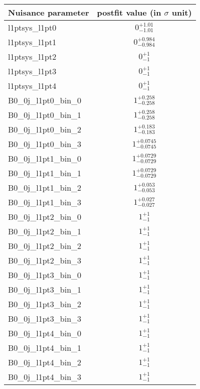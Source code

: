 
\begin{tabular}{|l|c|}
\hline
Nuisance parameter & postfit value (in $\sigma$ unit) \\\hline
l1ptsys\_l1pt0 & $0^{+1.01}_{-1.01}$ \\
l1ptsys\_l1pt1 & $0^{+0.984}_{-0.984}$ \\
l1ptsys\_l1pt2 & $0^{+1}_{-1}$ \\
l1ptsys\_l1pt3 & $0^{+1}_{-1}$ \\
l1ptsys\_l1pt4 & $0^{+1}_{-1}$ \\
B0\_0j\_l1pt0\_bin\_0 & $1^{+0.258}_{-0.258}$ \\
B0\_0j\_l1pt0\_bin\_1 & $1^{+0.258}_{-0.258}$ \\
B0\_0j\_l1pt0\_bin\_2 & $1^{+0.183}_{-0.183}$ \\
B0\_0j\_l1pt0\_bin\_3 & $1^{+0.0745}_{-0.0745}$ \\
B0\_0j\_l1pt1\_bin\_0 & $1^{+0.0729}_{-0.0729}$ \\
B0\_0j\_l1pt1\_bin\_1 & $1^{+0.0729}_{-0.0729}$ \\
B0\_0j\_l1pt1\_bin\_2 & $1^{+0.053}_{-0.053}$ \\
B0\_0j\_l1pt1\_bin\_3 & $1^{+0.027}_{-0.027}$ \\
B0\_0j\_l1pt2\_bin\_0 & $1^{+1}_{-1}$ \\
B0\_0j\_l1pt2\_bin\_1 & $1^{+1}_{-1}$ \\
B0\_0j\_l1pt2\_bin\_2 & $1^{+1}_{-1}$ \\
B0\_0j\_l1pt2\_bin\_3 & $1^{+1}_{-1}$ \\
B0\_0j\_l1pt3\_bin\_0 & $1^{+1}_{-1}$ \\
B0\_0j\_l1pt3\_bin\_1 & $1^{+1}_{-1}$ \\
B0\_0j\_l1pt3\_bin\_2 & $1^{+1}_{-1}$ \\
B0\_0j\_l1pt3\_bin\_3 & $1^{+1}_{-1}$ \\
B0\_0j\_l1pt4\_bin\_0 & $1^{+1}_{-1}$ \\
B0\_0j\_l1pt4\_bin\_1 & $1^{+1}_{-1}$ \\
B0\_0j\_l1pt4\_bin\_2 & $1^{+1}_{-1}$ \\
B0\_0j\_l1pt4\_bin\_3 & $1^{+1}_{-1}$ \\
\hline
\end{tabular}
